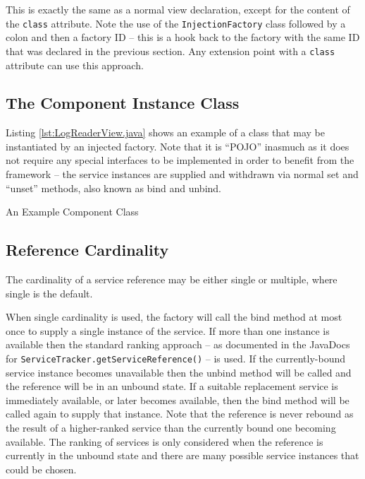 \documentclass[12pt]{article}
\begin{document}
This is exactly the same as a normal view declaration, except for the content of the \texttt{class} attribute. Note the use of the \texttt{InjectionFactory} class followed by a colon and then a factory ID -- this is a hook back to the factory with the same ID that was declared in the previous section. Any extension point with a \texttt{class} attribute can use this approach.

\subsection{The Component Instance Class}

Listing \ref{lst:LogReaderView.java} shows an example of a class that may be instantiated by an injected factory. Note that it is ``POJO'' inasmuch as it does not require any special interfaces to be implemented in order to benefit from the framework -- the service instances are supplied and withdrawn via normal set and ``unset'' methods, also known as bind and unbind.

\begin{program}

\caption{An Example Component Class}
\label{lst:LogReaderView.java}
\end{program}

\subsection{Reference Cardinality}

The cardinality of a service reference may be either single or multiple, where single is the default.

When single cardinality is used, the factory will call the bind method at most once to supply a single instance of the service. If more than one instance is available then the standard ranking approach -- as documented in the JavaDocs for \texttt{ServiceTracker.getServiceReference()} -- is used. If the currently-bound service instance becomes unavailable then the unbind method will be called and the reference will be in an unbound state. If a suitable replacement service is immediately available, or later becomes available, then the bind method will be called again to supply that instance. Note that the reference is never rebound as the result of a higher-ranked service than the currently bound one becoming available. The ranking of services is only considered when the reference is currently in the unbound state and there are many possible service instances that could be chosen.
\end{document}
